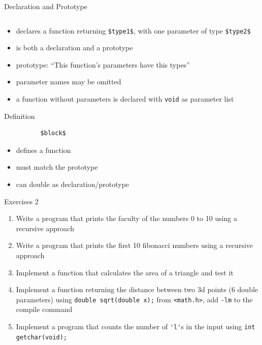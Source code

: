 \documentclass[english,compress]{beamer}
\begin{document}
\begin{frame}[fragile]{Declaration and Prototype}
	\begin{lstlisting}[numbers=none]
		%{\it\color{blue}type1}% func(%{\it\color{blue}{type2}% param1);
	\end{lstlisting}
	\begin{itemize}
		\item declares a function returning {\color{blue}\lstinline|$type1$|}, with one parameter of type {\color{blue}\lstinline|$type2$|}
		\item is both a declaration and a prototype
		\item prototype: ``This function's parameters have this types''
		\item parameter names may be omitted
		\item a function without parameters is declared with \lstinline|void| as parameter list
	\end{itemize}
\end{frame}

\begin{frame}[fragile]{Definition}
	\begin{lstlisting}[numbers=none]
		%{\it\color{blue}type1}% func(%{\it\color{blue}{type2}% param1)
		  $block$
	\end{lstlisting}
	\begin{itemize}
		\item defines a function
		\item must match the prototype
		\item can double as declaration/prototype
	\end{itemize}
\end{frame}

\begin{frame}[fragile]{Exercises 2}
	\begin{enumerate}
		\item Write a program that prints the faculty of the numbers 0 to 10 using a recursive approach
		\item Write a program that prints the first 10 fibonacci numbers using a recursive approach
		\item Implement a function that calculates the area of a triangle and test it
		\item Implement a function returning the distance between two 3d points (6 double parameters) using \lstinline|double sqrt(double x);| from \lstinline|<math.h>|, add \verb|-lm| to the compile command
		\item Implement a program that counts the number of \lstinline|'l'|s in the input using \lstinline|int getchar(void);|
	\end{enumerate}
\end{frame}
\end{document}
